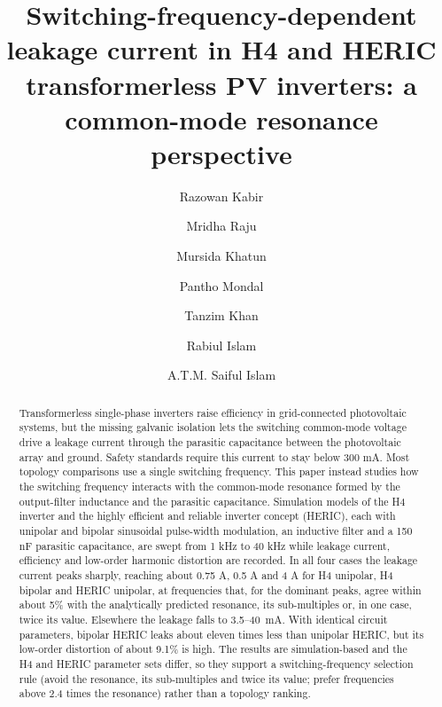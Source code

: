 \documentclass[preprint,12pt]{elsarticle}
\begin{document}
\begin{frontmatter}

\title{Switching-frequency-dependent leakage current in H4 and HERIC transformerless PV inverters: a common-mode resonance perspective}

\author[kuet]{Razowan Kabir}
\author[kuet]{Mridha Raju}
\author[gstu]{Mursida Khatun}
\author[gstu]{Pantho Mondal}
\author[gstu]{Tanzim Khan}
\author[gstu]{Rabiul Islam}
\author[gstu]{A.T.M. Saiful Islam}



\begin{abstract}
Transformerless single-phase inverters raise efficiency in grid-connected photovoltaic systems, but the missing galvanic isolation lets the switching common-mode voltage drive a leakage current through the parasitic capacitance between the photovoltaic array and ground. Safety standards require this current to stay below 300 mA. Most topology comparisons use a single switching frequency. This paper instead studies how the switching frequency interacts with the common-mode resonance formed by the output-filter inductance and the parasitic capacitance. Simulation models of the H4 inverter and the highly efficient and reliable inverter concept (HERIC), each with unipolar and bipolar sinusoidal pulse-width modulation, an inductive filter and a 150 nF parasitic capacitance, are swept from 1 kHz to 40 kHz while leakage current, efficiency and low-order harmonic distortion are recorded. In all four cases the leakage current peaks sharply, reaching about 0.75 A, 0.5 A and 4 A for H4 unipolar, H4 bipolar and HERIC unipolar, at frequencies that, for the dominant peaks, agree within about 5\% with the analytically predicted resonance, its sub-multiples or, in one case, twice its value. Elsewhere the leakage falls to 3.5--40~mA. With identical circuit parameters, bipolar HERIC leaks about eleven times less than unipolar HERIC, but its low-order distortion of about 9.1\% is high. The results are simulation-based and the H4 and HERIC parameter sets differ, so they support a switching-frequency selection rule (avoid the resonance, its sub-multiples and twice its value; prefer frequencies above 2.4 times the resonance) rather than a topology ranking.
\end{abstract}


\end{frontmatter}
\end{document}
